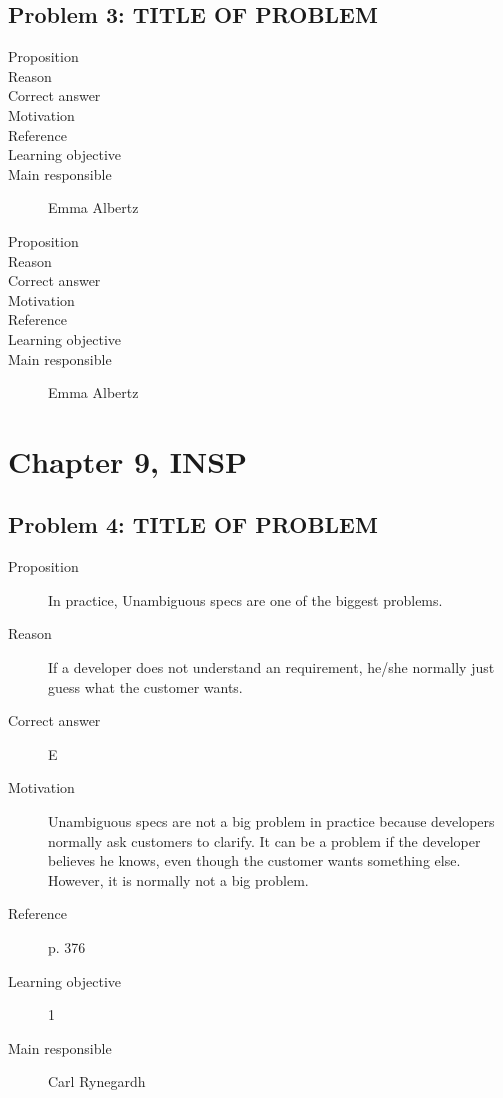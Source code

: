 \documentclass[10pt,a4paper]{article}
\begin{document}
\subsection*{Problem 3: TITLE OF PROBLEM}
\begin{description}
\item[Proposition] 
\item[Reason] 
\item[Correct answer]
\item[Motivation]
\item[Reference]
\item[Learning objective]
\item[Main responsible] Emma Albertz
\end{description}

\begin{description}
\item[Proposition] 
\item[Reason] 
\item[Correct answer]
\item[Motivation]
\item[Reference]
\item[Learning objective]
\item[Main responsible] Emma Albertz
\end{description}

\section*{Chapter 9, INSP}
\subsection*{Problem 4: TITLE OF PROBLEM}
\begin{description}
\item[Proposition] In practice, Unambiguous specs are one of the biggest problems. 
\item[Reason] If a developer does not understand an requirement, he/she normally just guess what the customer wants.
\item[Correct answer] E
\item[Motivation] Unambiguous specs are not a big problem in practice because developers normally ask customers to clarify. It can be a problem if the developer believes he knows, even though the customer wants something else. However, it is normally not a big problem.
\item[Reference] p. 376
\item[Learning objective] 1
\item[Main responsible] Carl Rynegardh
\end{description}
\end{document}
